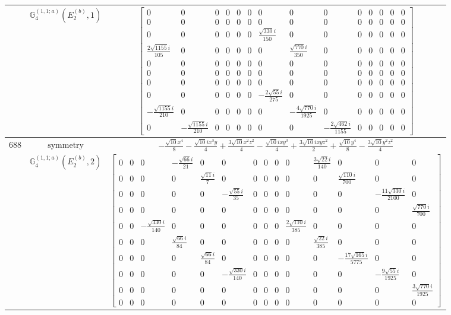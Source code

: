 \documentclass[fleqn,8pt,landscape]{jsarticle}
\begin{document}
\begin{longtable}{ccc}
$  $ & $ \mathbb{G}_{4}^{(1,1;a)}(E_{2}^{(b)},1) $ & $ \begin{bmatrix} 0 & 0 & 0 & 0 & 0 & 0 & 0 & 0 & 0 & 0 & 0 & 0 & 0 & 0 \\ 0 & 0 & 0 & 0 & 0 & 0 & 0 & 0 & 0 & 0 & 0 & 0 & 0 & 0 \\ 0 & 0 & 0 & 0 & 0 & 0 & \frac{\sqrt{330} i}{150} & 0 & 0 & 0 & 0 & 0 & 0 & 0 \\ \frac{2 \sqrt{1155} i}{105} & 0 & 0 & 0 & 0 & 0 & 0 & \frac{\sqrt{770} i}{350} & 0 & 0 & 0 & 0 & 0 & 0 \\ 0 & 0 & 0 & 0 & 0 & 0 & 0 & 0 & 0 & 0 & 0 & 0 & 0 & 0 \\ 0 & 0 & 0 & 0 & 0 & 0 & 0 & 0 & 0 & 0 & 0 & 0 & 0 & 0 \\ 0 & 0 & 0 & 0 & 0 & 0 & 0 & 0 & 0 & 0 & 0 & 0 & 0 & 0 \\ 0 & 0 & 0 & 0 & 0 & 0 & - \frac{2 \sqrt{55} i}{275} & 0 & 0 & 0 & 0 & 0 & 0 & 0 \\ - \frac{\sqrt{1155} i}{210} & 0 & 0 & 0 & 0 & 0 & 0 & - \frac{4 \sqrt{770} i}{1925} & 0 & 0 & 0 & 0 & 0 & 0 \\ 0 & - \frac{\sqrt{1155} i}{210} & 0 & 0 & 0 & 0 & 0 & 0 & - \frac{2 \sqrt{462} i}{1155} & 0 & 0 & 0 & 0 & 0 \end{bmatrix} $ \\ \hline
$ 688 $ & $ \text{symmetry} $ & $ - \frac{\sqrt{10} x^{4}}{8} - \frac{\sqrt{10} i x^{3} y}{4} + \frac{3 \sqrt{10} x^{2} z^{2}}{4} - \frac{\sqrt{10} i x y^{3}}{4} + \frac{3 \sqrt{10} i x y z^{2}}{2} + \frac{\sqrt{10} y^{4}}{8} - \frac{3 \sqrt{10} y^{2} z^{2}}{4} $ \\
$  $ & $ \mathbb{G}_{4}^{(1,1;a)}(E_{2}^{(b)},2) $ & $ \begin{bmatrix} 0 & 0 & 0 & - \frac{\sqrt{66} i}{21} & 0 & 0 & 0 & 0 & 0 & 0 & \frac{3 \sqrt{22} i}{140} & 0 & 0 & 0 \\ 0 & 0 & 0 & 0 & \frac{\sqrt{11} i}{7} & 0 & 0 & 0 & 0 & 0 & 0 & \frac{\sqrt{110} i}{700} & 0 & 0 \\ 0 & 0 & 0 & 0 & 0 & - \frac{\sqrt{55} i}{35} & 0 & 0 & 0 & 0 & 0 & 0 & - \frac{11 \sqrt{330} i}{2100} & 0 \\ 0 & 0 & 0 & 0 & 0 & 0 & 0 & 0 & 0 & 0 & 0 & 0 & 0 & \frac{\sqrt{770} i}{700} \\ 0 & 0 & - \frac{\sqrt{330} i}{140} & 0 & 0 & 0 & 0 & 0 & 0 & \frac{2 \sqrt{110} i}{385} & 0 & 0 & 0 & 0 \\ 0 & 0 & 0 & \frac{\sqrt{66} i}{84} & 0 & 0 & 0 & 0 & 0 & 0 & \frac{\sqrt{22} i}{385} & 0 & 0 & 0 \\ 0 & 0 & 0 & 0 & \frac{\sqrt{66} i}{84} & 0 & 0 & 0 & 0 & 0 & 0 & - \frac{17 \sqrt{165} i}{5775} & 0 & 0 \\ 0 & 0 & 0 & 0 & 0 & - \frac{\sqrt{330} i}{140} & 0 & 0 & 0 & 0 & 0 & 0 & - \frac{9 \sqrt{55} i}{1925} & 0 \\ 0 & 0 & 0 & 0 & 0 & 0 & 0 & 0 & 0 & 0 & 0 & 0 & 0 & \frac{3 \sqrt{770} i}{1925} \\ 0 & 0 & 0 & 0 & 0 & 0 & 0 & 0 & 0 & 0 & 0 & 0 & 0 & 0 \end{bmatrix} $ \\ \hline

\end{longtable}
\end{document}
